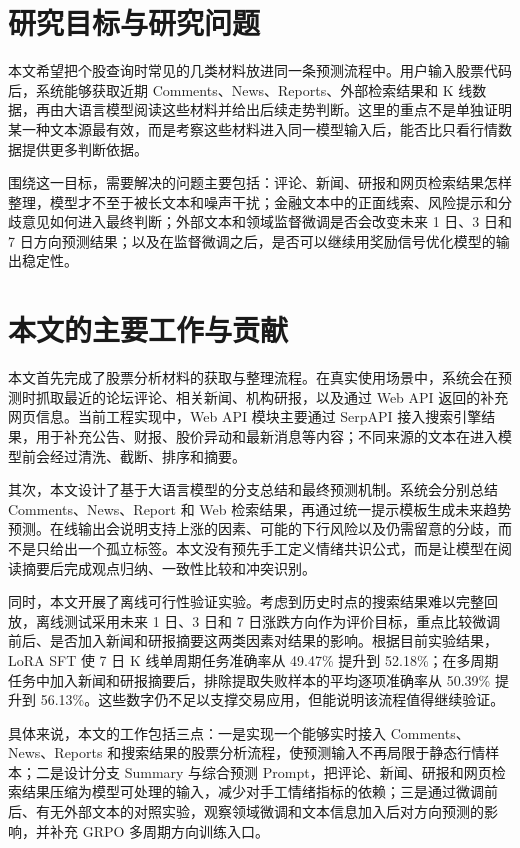 \section{研究目标与研究问题}

本文希望把个股查询时常见的几类材料放进同一条预测流程中。用户输入股票代码后，系统能够获取近期 Comments、News、Reports、外部检索结果和 K 线数据，再由大语言模型阅读这些材料并给出后续走势判断。这里的重点不是单独证明某一种文本源最有效，而是考察这些材料进入同一模型输入后，能否比只看行情数据提供更多判断依据。

围绕这一目标，需要解决的问题主要包括：评论、新闻、研报和网页检索结果怎样整理，模型才不至于被长文本和噪声干扰；金融文本中的正面线索、风险提示和分歧意见如何进入最终判断；外部文本和领域监督微调是否会改变未来 1 日、3 日和 7 日方向预测结果；以及在监督微调之后，是否可以继续用奖励信号优化模型的输出稳定性。

\section{本文的主要工作与贡献}

本文首先完成了股票分析材料的获取与整理流程。在真实使用场景中，系统会在预测时抓取最近的论坛评论、相关新闻、机构研报，以及通过 Web API 返回的补充网页信息。当前工程实现中，Web API 模块主要通过 SerpAPI 接入搜索引擎结果，用于补充公告、财报、股价异动和最新消息等内容；不同来源的文本在进入模型前会经过清洗、截断、排序和摘要。

其次，本文设计了基于大语言模型的分支总结和最终预测机制。系统会分别总结 Comments、News、Report 和 Web 检索结果，再通过统一提示模板生成未来趋势预测。在线输出会说明支持上涨的因素、可能的下行风险以及仍需留意的分歧，而不是只给出一个孤立标签。本文没有预先手工定义情绪共识公式，而是让模型在阅读摘要后完成观点归纳、一致性比较和冲突识别。

同时，本文开展了离线可行性验证实验。考虑到历史时点的搜索结果难以完整回放，离线测试采用未来 1 日、3 日和 7 日涨跌方向作为评价目标，重点比较微调前后、是否加入新闻和研报摘要这两类因素对结果的影响。根据目前实验结果，LoRA SFT 使 7 日 K 线单周期任务准确率从 49.47\% 提升到 52.18\%；在多周期任务中加入新闻和研报摘要后，排除提取失败样本的平均逐项准确率从 50.39\% 提升到 56.13\%。这些数字仍不足以支撑交易应用，但能说明该流程值得继续验证。

具体来说，本文的工作包括三点：一是实现一个能够实时接入 Comments、News、Reports 和搜索结果的股票分析流程，使预测输入不再局限于静态行情样本；二是设计分支 Summary 与综合预测 Prompt，把评论、新闻、研报和网页检索结果压缩为模型可处理的输入，减少对手工情绪指标的依赖；三是通过微调前后、有无外部文本的对照实验，观察领域微调和文本信息加入后对方向预测的影响，并补充 GRPO 多周期方向训练入口。

